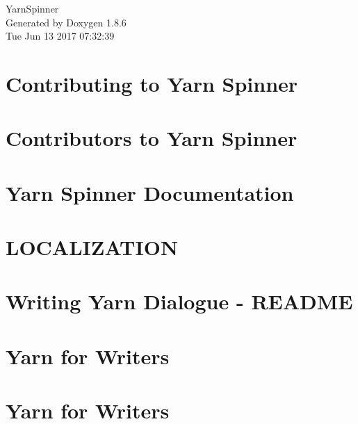 \documentclass[twoside]{book}
\newcommand{\clearemptydoublepage}{%
  \newpage{\pagestyle{empty}\cleardoublepage}%
}
\begin{document}
\hypersetup{pageanchor=false}
\begin{titlepage}
\vspace*{7cm}
\begin{center}%
{\Large Yarn\-Spinner }\\
\vspace*{1cm}
{\large Generated by Doxygen 1.8.6}\\
\vspace*{0.5cm}
{\small Tue Jun 13 2017 07:32:39}\\
\end{center}
\end{titlepage}
\clearemptydoublepage
\tableofcontents
\clearemptydoublepage
{}
\hypersetup{pageanchor=true}

\chapter{Contributing to Yarn Spinner}
\label{a00002}
\hypertarget{a00002}{}

\chapter{Contributors to Yarn Spinner}
\label{a00004}
\hypertarget{a00004}{}

\chapter{Yarn Spinner Documentation}
\label{a00006}
\hypertarget{a00006}{}

\chapter{L\-O\-C\-A\-L\-I\-Z\-A\-T\-I\-O\-N}
\label{a00008}
\hypertarget{a00008}{}

\chapter{Writing Yarn Dialogue -\/ R\-E\-A\-D\-M\-E}
\label{a00010}
\hypertarget{a00010}{}

\chapter{Yarn for Writers}
\label{a00012}
\hypertarget{a00012}{}

\chapter{Yarn for Writers}
\label{a00014}
\hypertarget{a00014}{}

\end{document}
